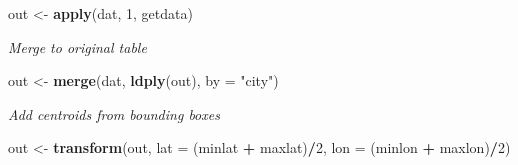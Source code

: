 \documentclass[author-year, review, 11pt]{components/elsarticle} %
\newenvironment{Shaded}{\begin{snugshade}}{\end{snugshade}}
\newcommand{\KeywordTok}[1]{\textcolor[rgb]{0.13,0.29,0.53}{\textbf{#1}}}
\newcommand{\DataTypeTok}[1]{\textcolor[rgb]{0.13,0.29,0.53}{#1}}
\newcommand{\DecValTok}[1]{\textcolor[rgb]{0.00,0.00,0.81}{#1}}
\newcommand{\StringTok}[1]{\textcolor[rgb]{0.31,0.60,0.02}{#1}}
\newcommand{\OtherTok}[1]{\textcolor[rgb]{0.56,0.35,0.01}{#1}}
\newcommand{\ControlFlowTok}[1]{\textcolor[rgb]{0.13,0.29,0.53}{\textbf{#1}}}
\newcommand{\OperatorTok}[1]{\textcolor[rgb]{0.81,0.36,0.00}{\textbf{#1}}}
\newcommand{\NormalTok}[1]{#1}
\begin{document}
\begin{Shaded}
\end{Shaded}

\begin{Shaded}
\begin{Highlighting}[]
\NormalTok{out <-}\StringTok{ }\KeywordTok{apply}\NormalTok{(dat, }\DecValTok{1}\NormalTok{, getdata)}
\end{Highlighting}
\end{Shaded}

\emph{Merge to original table}

\begin{Shaded}
\begin{Highlighting}[]
\NormalTok{out <-}\StringTok{ }\KeywordTok{merge}\NormalTok{(dat, }\KeywordTok{ldply}\NormalTok{(out), }\DataTypeTok{by =} \StringTok{"city"}\NormalTok{)}
\end{Highlighting}
\end{Shaded}

\emph{Add centroids from bounding boxes}

\begin{Shaded}
\begin{Highlighting}[]
\NormalTok{out <-}\StringTok{ }\KeywordTok{transform}\NormalTok{(out, }\DataTypeTok{lat =}\NormalTok{ (minlat }\OperatorTok{+}\StringTok{ }\NormalTok{maxlat)}\OperatorTok{/}\DecValTok{2}\NormalTok{, }\DataTypeTok{lon =}\NormalTok{ (minlon }\OperatorTok{+}\StringTok{ }\NormalTok{maxlon)}\OperatorTok{/}\DecValTok{2}\NormalTok{)}
\end{Highlighting}
\end{Shaded}
\end{document}
